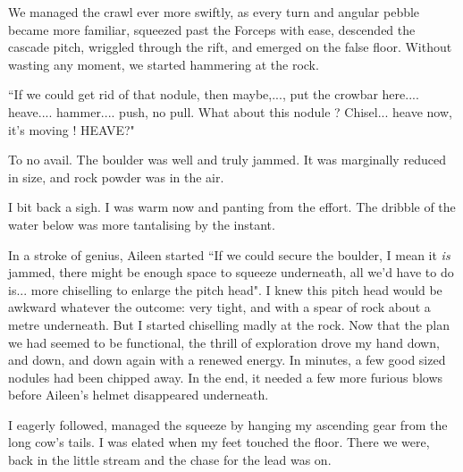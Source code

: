We managed the crawl ever more swiftly, as every turn and angular pebble became more familiar, squeezed past the Forceps with ease, descended the cascade pitch, wriggled through the rift, and emerged on the false floor. Without wasting any moment, we started hammering at the rock. 

``If we could get rid of that nodule, then maybe,..., put the crowbar here.... heave.... hammer.... push, no pull. What about this nodule ? Chisel... heave now, it's moving ! HEAVE?"


To no avail. The boulder was well and truly jammed. It was marginally reduced in size, and rock powder was in the air.

I bit back a sigh. I was warm now and panting from the effort. The dribble of the water below was more tantalising by the instant. 

In a stroke of genius, Aileen started ``If we could secure the boulder, I mean it \emph{is} jammed, there might be enough space to squeeze underneath, all we'd have to do is... more chiselling to enlarge the pitch head".
I knew this pitch head would be awkward whatever the outcome: very tight, and with a spear of rock about a metre underneath. But I started chiselling madly at the rock. Now that the plan we had seemed to be functional, the thrill of exploration drove my hand down, and down, and down again with a renewed energy. In minutes, a few good sized nodules had been chipped away. In the end, it needed a few more furious blows before Aileen's helmet disappeared underneath.

I eagerly followed, managed the squeeze by hanging my ascending gear from the long cow's tails. I was elated when my feet touched the floor. There we were, back in the little stream and the chase for the lead was on.




